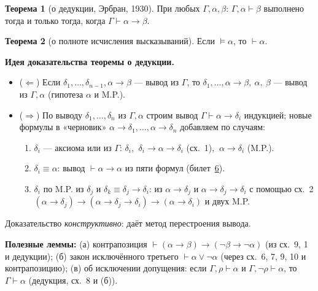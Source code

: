 \documentclass[11pt,a4paper]{article}
\newcommand{\vd}{\vdash}
\theoremstyle{definition}
\newtheorem*{thm}{Теорема}
\begin{document}
\begin{thm}[о дедукции, Эрбран, 1930]
При любых $\Gamma,\alpha,\beta$: $\Gamma,\alpha\vd\beta$ выполнено тогда и только тогда, когда $\Gamma\vd\alpha\to\beta$.
\end{thm}
\begin{thm}[о полноте исчисления высказываний]
Если $\models\alpha$, то $\vd\alpha$.
\end{thm}

\textbf{Идея доказательства теоремы о дедукции.}
\begin{itemize}
\item ($\Leftarrow$) Если $\delta_1,\dots,\delta_{n-1},\alpha\to\beta$ --- вывод из $\Gamma$, то
  $\delta_1,\dots,\alpha\to\beta,\ \alpha,\ \beta$ --- вывод из $\Gamma,\alpha$ (гипотеза $\alpha$ и M.P.).
\item ($\Rightarrow$) По выводу $\delta_1,\dots,\delta_n$ из $\Gamma,\alpha$ строим вывод $\Gamma\vd\alpha\to\delta_i$ индукцией; новые формулы в «черновик» $\alpha\to\delta_1,\dots,\alpha\to\delta_n$ добавляем по случаям:
  \begin{enumerate}
  \item $\delta_i$ --- аксиома или из $\Gamma$: $\delta_i$, $\ \delta_i\to\alpha\to\delta_i$ (сх.\ 1), $\ \alpha\to\delta_i$ (M.P.).
  \item $\delta_i\equiv\alpha$: вывод $\vd\alpha\to\alpha$ из пяти формул (билет~\hyperref[T:6]{6}).
  \item $\delta_i$ по M.P. из $\delta_j$ и $\delta_k\equiv\delta_j\to\delta_i$: из $\alpha\to\delta_j$ и $\alpha\to\delta_j\to\delta_i$ с помощью сх.\ 2 $(\alpha\to\delta_j)\to(\alpha\to\delta_j\to\delta_i)\to(\alpha\to\delta_i)$ и двух M.P.
  \end{enumerate}
\end{itemize}
Доказательство \emph{конструктивно}: даёт метод перестроения вывода.

\textbf{Полезные леммы:} (а) контрапозиция $\vd(\alpha\to\beta)\to(\neg\beta\to\neg\alpha)$ (из сх.\ 9, 1 и дедукции); (б) закон
исключённого третьего $\vd\alpha\vee\neg\alpha$ (через сх.\ 6, 7, 9, 10 и контрапозицию); (в) об исключении допущения: если $\Gamma,\rho\vd\alpha$ и $\Gamma,\neg\rho\vd\alpha$, то $\Gamma\vd\alpha$ (дедукция, сх.\ 8 и (б)).
\end{document}

